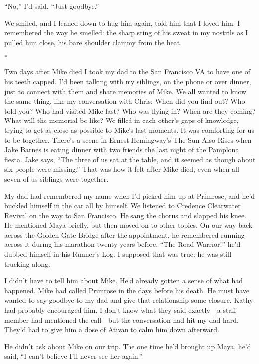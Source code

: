 \documentclass[12pt]{book}
\begin{document}
``No,'' I'd said. ``Just goodbye.''

We smiled, and I leaned down to hug him again, told him that I loved him. I remembered the way he smelled: the sharp sting of his sweat in my nostrils as I pulled him close, his bare shoulder clammy from the heat.

\begin{center}$*$\end{center}

Two days after Mike died I took my dad to the San Francisco VA to have one of his teeth capped. I'd been talking with my siblings, on the phone or over dinner, just to connect with them and share memories of Mike. We all wanted to know the same thing, like my conversation with Chris: When did you find out? Who told you? Who had visited Mike last? Who was flying in? When are they coming? What will the memorial be like? We filled in each other's gaps of knowledge, trying to get as close as possible to Mike's last moments. It was comforting for us to be together. There's a scene in Ernest Hemingway's The Sun Also Rises when Jake Barnes is eating dinner with two friends the last night of the Pamplona fiesta. Jake says, ``The three of us sat at the table, and it seemed as though about six people were missing.'' That was how it felt after Mike died, even when all seven of us siblings were together.

My dad had remembered my name when I'd picked him up at Primrose, and he'd buckled himself in the car all by himself. We listened to Credence Clearwater Revival on the way to San Francisco. He sang the chorus and slapped his knee. He mentioned Maya briefly, but then moved on to other topics. On our way back across the Golden Gate Bridge after the appointment, he remembered running across it during his marathon twenty years before. ``The Road Warrior!'' he'd dubbed himself in his Runner's Log. I supposed that was true: he was still trucking along.

I didn't have to tell him about Mike. He'd already gotten a sense of what had happened. Mike had called Primrose in the days before his death. He must have wanted to say goodbye to my dad and give that relationship some closure. Kathy had probably encouraged him. I don't know what they said exactly---a staff member had mentioned the call---but the conversation had hit my dad hard. They'd had to give him a dose of Ativan to calm him down afterward.

He didn't ask about Mike on our trip. The one time he'd brought up Maya, he'd said, ``I can't believe I'll never see her again.''
\end{document}
